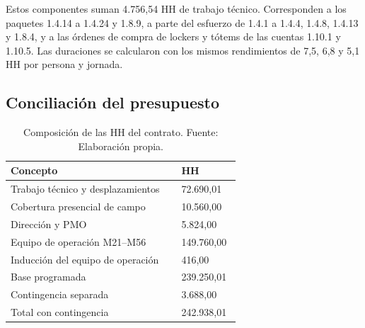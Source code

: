 \documentclass[11pt]{article}
\begin{document}
Estos componentes suman 4.756,54 HH de trabajo técnico. Corresponden a los paquetes 1.4.14 a 1.4.24 y 1.8.9, a parte del esfuerzo de 1.4.1 a 1.4.4, 1.4.8, 1.4.13 y 1.8.4, y a las órdenes de compra de lockers y tótems de las cuentas 1.10.1 y 1.10.5. Las duraciones se calcularon con los mismos rendimientos de 7,5, 6,8 y 5,1 HH por persona y jornada.

\subsection{Conciliación del presupuesto}

\begingroup
\small
\begin{longtable}{@{}p{0.69\linewidth}p{0.24\linewidth}@{}}
\caption[Composición de las HH del contrato]{Composición de las HH del contrato. Fuente: Elaboración propia.}\label{tab:t15-3}\\
\toprule
\textbf{Concepto} & \textbf{HH} \\
\midrule
\endhead
\bottomrule
\endlastfoot
Trabajo técnico y desplazamientos & 72.690,01 \\
Cobertura presencial de campo & 10.560,00 \\
Dirección y PMO & 5.824,00 \\
Equipo de operación M21--M56 & 149.760,00 \\
Inducción del equipo de operación & 416,00 \\
Base programada & 239.250,01 \\
Contingencia separada & 3.688,00 \\
Total con contingencia & 242.938,01 \\
\end{longtable}
\endgroup
\end{document}
